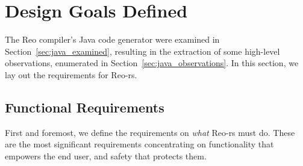 \section{Design Goals Defined}
\label{sec:design_goals}
%
%
%
%

The Reo compiler's Java code generator were examined in Section~\ref{sec:java_examined}, resulting in the extraction of some high-level observations, enumerated in Section~\ref{sec:java_observations}. In this section, we lay out the requirements for Reo-rs.

\subsection{Functional Requirements}
First and foremost, we define the requirements on \textit{what} Reo-rs must do. These are the most significant requirements concentrating on functionality that empowers the end user, and safety that protects them.


